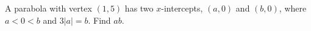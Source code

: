 A parabola with vertex $(1,5)$ has two $x$-intercepts, $(a,0)$ and $(b,0)$, where $a<0<b$ and $3|a|=b$. Find $ab$.
